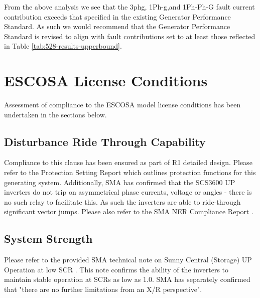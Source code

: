 \documentclass{../grid-link-report}
\newcommand{\projectassetsdir}{../project-assets}
\begin{document}
	From the above analysis we see that the 3phg, 1Ph-g,and 1Ph-Ph-G fault current contribution exceeds that specified in the existing Generator Performance Standard. As such we would recommend that the Generator Performance Standard is revised to align with fault contributions set to at least those reflected in Table \ref{tab:528-results-upperbound}.
	
	\section{ESCOSA License Conditions}	
	Assessment of compliance to the ESCOSA model license conditions \cite{escosa} has been undertaken in the sections below.
	
	\subsection{Disturbance Ride Through Capability}
	\begin{tcolorbox}[lightgreenbox]
		
	\end{tcolorbox}
	Compliance to this clause has been ensured as part of R1 detailed design. Please refer to the Protection Setting Report \cite{protection-design-report} which outlines protection functions for this generating system. Additionally, SMA has confirmed that the SCS3600 UP inverters do not trip on asymmetrical phase currents, voltage or angles - there is no such relay to facilitate this. As such the inverters are able to ride-through significant vector jumps. Please also refer to the SMA NER Compliance Report \cite{SMA-NER-compliance-report}.
	\subsection{System Strength}
	\begin{tcolorbox}[lightgreenbox]
		
	\end{tcolorbox}
	Please refer to the provided SMA technical note on Sunny Central (Storage) UP Operation at low SCR \cite{low-scr}. This note confirms the ability of the inverters to maintain stable operation at SCRs as low as 1.0. SMA has separately confirmed that "there are no further limitations from an X/R perspective".


	
	
	
	
	
\end{document}
